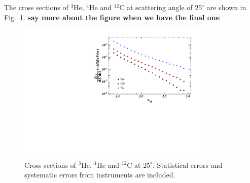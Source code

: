 

The cross sections of $^{3}$He, $^{4}$He and $^{12}$C at scattering angle of $25^{\circ}$ are shown in Fig.~\ref{xs}.
{\bf say more about the figure when we have the final one}

                \begin{figure}[!ht]
		\begin{center}
		\includegraphics[width=9.5cm]{./figures/XS_Comp_25_May27.pdf}
		\end{center}
		\vspace*{-5mm}
		\caption{Cross sections of $^{3}$He, $^{4}$He and $^{12}$C at $25^{\circ}$. Statistical errors and
                  systematic errors from instruments are included.}
		\label{xs}
		\end{figure}


